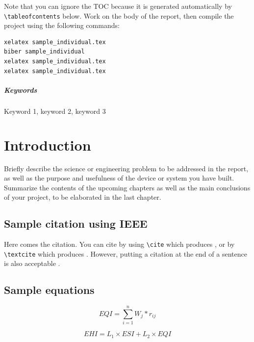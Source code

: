 \documentclass{senior-design}
\begin{document}
Note that you can ignore the TOC because it is generated automatically by \verb|\tableofcontents| below. Work on the body of the report, then compile the project using the following commands:
\begin{lstlisting}
xelatex sample_individual.tex
biber sample_individual
xelatex sample_individual.tex
xelatex sample_individual.tex
\end{lstlisting}

\paragraph{Keywords}
Keyword 1, keyword 2, keyword 3

\tableofcontents

\mainmatter
\chapter{Introduction}
Briefly describe the science or engineering problem to be addressed in the report, as well as the purpose and usefulness of the device or system you have built. Summarize the contents of the upcoming chapters as well as the main conclusions of your project, to be elaborated in the last chapter.

\section{Sample citation using IEEE}
Here comes the citation. You can cite by using \verb|\cite| which produces \cite{book1,paper1}, or by \verb|\textcite| which produces \textcite{book2}. However, putting a citation at the end of a sentence is also acceptable \cite{webpage1}.

\section{Sample equations}
\begin{equation}
    EQI = \sum_{i=1}^{n}W_j * r_{ij}
\end{equation}

\begin{equation}
    EHI = L_1 \times ESI + L_2 \times EQI
\end{equation}
\end{document}
